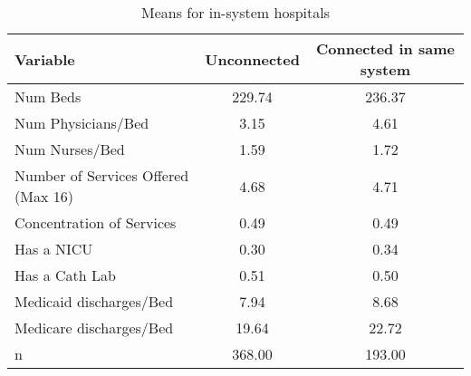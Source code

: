 \begin{table}[ht!]
\centering
\caption{Means for in-system hospitals}
\centering
\begin{tabular}[t]{lcc}
\toprule
Variable & Unconnected & Connected in same system\\
\midrule
Num Beds & 229.74 & 236.37\\
Num Physicians/Bed & 3.15 & 4.61\\
Num Nurses/Bed & 1.59 & 1.72\\
Number of Services Offered (Max 16) & 4.68 & 4.71\\
Concentration of Services & 0.49 & 0.49\\
\addlinespace
Has a NICU & 0.30 & 0.34\\
Has a Cath Lab & 0.51 & 0.50\\
Medicaid discharges/Bed & 7.94 & 8.68\\
Medicare discharges/Bed & 19.64 & 22.72\\
n & 368.00 & 193.00\\
\bottomrule
\end{tabular}
\end{table}
